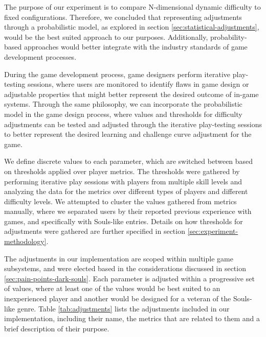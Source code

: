 The purpose of our experiment is to compare N-dimensional dynamic difficulty to fixed configurations. Therefore, we concluded that representing adjustments through a probabilistic model, as explored in section \ref{sec:statistical-adjustments}, would be the best suited approach to our purposes. Additionally, probability-based approaches would better integrate with the industry standards of game development processes.

During the game development process, game designers perform iterative play-testing sessions, where users are monitored to identify flaws in game design or adjustable properties that might better represent the desired outcome of in-game systems. Through the same philosophy, we can incorporate the probabilistic model in the game design process, where values and thresholds for difficulty adjustments can be tested and adjusted through the iterative play-testing sessions to better represent the desired learning and challenge curve adjustment for the game.

We define discrete values to each parameter, which are switched between based on thresholds applied over player metrics. The thresholds were gathered by performing iterative play sessions with players from multiple skill levels and analyzing the data for the metrics over different types of players and different difficulty levels. We attempted to cluster the values gathered from metrics manually, where we separated users by their reported previous experience with games, and specifically with Souls-like entries. Details on how thresholds for adjustments were gathered are further specified in section \ref{sec:experiment-methodology}.

The adjustments in our implementation are scoped within multiple game subsystems, and were elected based in the considerations discussed in section \ref{sec:pain-points-dark-souls}. Each parameter is adjusted within a progressive set of values, where at least one of the values would be best suited to an inexperienced player and another would be designed for a veteran of the Souls-like genre. Table \ref{tab:adjustments} lists the adjustments included in our implementation, including their name, the metrics that are related to them and a brief description of their purpose.

